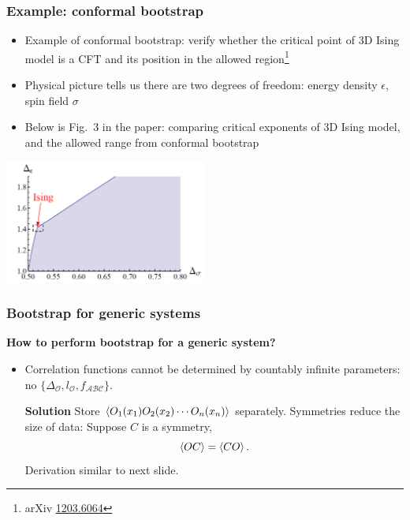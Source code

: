 \documentclass{beamer}
\begin{document}
\begin{frame}
\frametitle{Example: conformal bootstrap}

\begin{itemize}
    \item Example of conformal bootstrap: verify whether the critical point of 3D Ising model 
    is a CFT and its position in the allowed region\footnote{arXiv \href{https://arxiv.org/abs/1203.6064}{1203.6064}}
    \item Physical picture tells us there are two degrees of freedom: energy density $\epsilon$, spin field $\sigma$
    \item Below is Fig.~3 in the paper: comparing critical exponents of 3D Ising model, and the allowed range from conformal bootstrap
\end{itemize}

\begin{center}
    \includegraphics[width=0.5\textwidth]{3d-ising-cft-bootstrap-range.PNG}
\end{center}

\end{frame}

\begin{frame}
\frametitle{Bootstrap for generic systems}

\textbf{How to perform bootstrap for a generic system?}    

\begin{itemize}
    \item Correlation functions cannot be determined by countably infinite parameters: 
    no $\{\Delta_{\mathcal{O}}, l_{\mathcal{O}}, f_{\mathcal{A} \mathcal{B} \mathcal{C}}\}$.
    
    \textbf{Solution} Store $\expval{O_1(x_1) O_2(x_2) \cdots O_n (x_n)}$ separately. Symmetries reduce the size 
    of data: Suppose $C$ is a symmetry, 
    \begin{equation}
        \expval{OC} = \expval{CO}.
    \end{equation}
    Derivation similar to next slide.
\end{itemize}

\end{frame}
\end{document}
